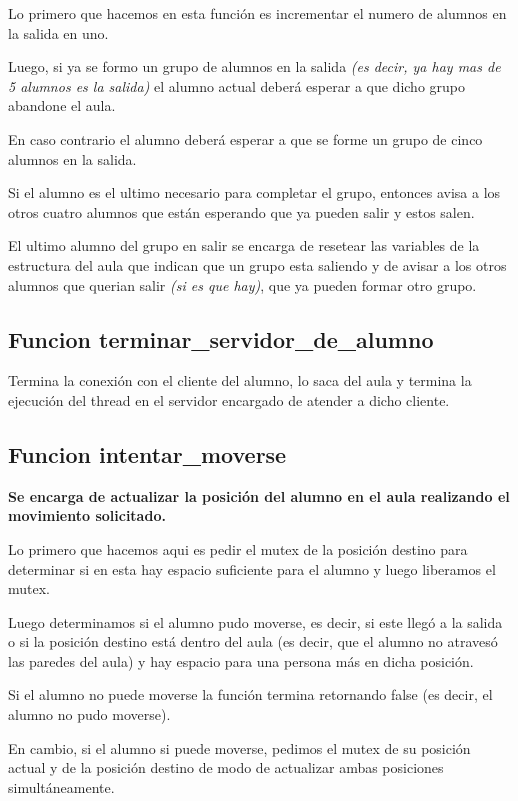 Lo primero que hacemos en esta función es incrementar el numero de alumnos en la salida en uno.

Luego, si ya se formo un grupo de alumnos en la salida \textit{(es decir, ya hay mas de 5 alumnos es la salida)} el alumno actual deberá esperar a que dicho grupo abandone el aula.

En caso contrario el alumno deberá esperar a que se forme un grupo de cinco alumnos en la salida.

Si el alumno es el ultimo necesario para completar el grupo, entonces avisa a los otros cuatro alumnos que están esperando que ya pueden salir y estos salen.

El ultimo alumno del grupo en salir se encarga de resetear las variables de la estructura del aula que indican que un grupo esta saliendo y de avisar a los otros alumnos que querian salir \textit{(si es que hay)}, que ya pueden formar otro grupo.


\subsection{Funcion terminar\_servidor\_de\_alumno}

Termina la conexión con el cliente del alumno, lo saca del aula y termina la ejecución del thread en el servidor encargado de atender a dicho cliente.

\subsection{Funcion intentar\_moverse}
\textbf{Se encarga de actualizar la posición del alumno en el aula realizando el movimiento solicitado.}

Lo primero que hacemos aqui es pedir el mutex de la posición destino para determinar si en esta hay espacio suficiente para el alumno y luego liberamos el mutex.

Luego determinamos si el alumno pudo moverse, es decir, si este llegó a la salida o si la posición destino está dentro del aula (es decir, que el alumno no atravesó las paredes del aula) y hay espacio para una persona más en dicha posición.

Si el alumno no puede moverse la función termina retornando false (es decir, el alumno no pudo moverse).

En cambio, si el alumno si puede moverse, pedimos el mutex de su posición actual y de la posición destino de modo de actualizar ambas posiciones simultáneamente. 

